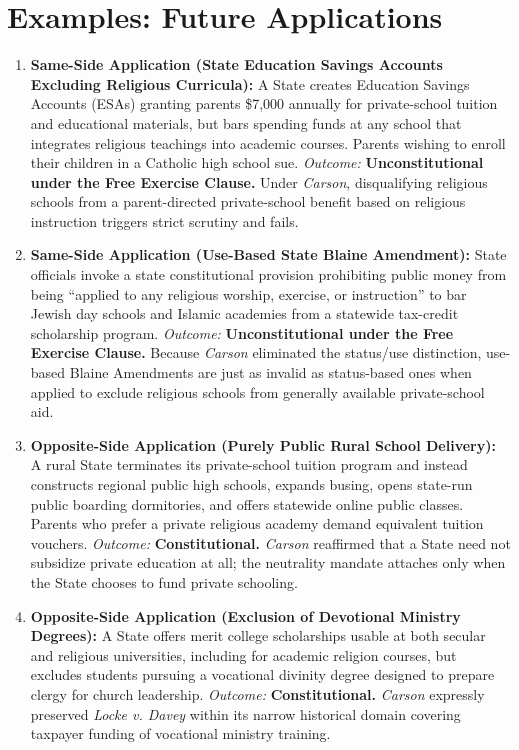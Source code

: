 \documentclass[12pt]{article}
\begin{document}
\section{Examples: Future Applications}

\begin{enumerate}
  \item \textbf{Same-Side Application (State Education Savings Accounts Excluding Religious Curricula):} A State creates Education Savings Accounts (ESAs) granting parents \$7,000 annually for private-school tuition and educational materials, but bars spending funds at any school that integrates religious teachings into academic courses. Parents wishing to enroll their children in a Catholic high school sue. \textit{Outcome:} \textbf{Unconstitutional under the Free Exercise Clause.} Under \textit{Carson}, disqualifying religious schools from a parent-directed private-school benefit based on religious instruction triggers strict scrutiny and fails.
  \item \textbf{Same-Side Application (Use-Based State Blaine Amendment):} State officials invoke a state constitutional provision prohibiting public money from being ``applied to any religious worship, exercise, or instruction'' to bar Jewish day schools and Islamic academies from a statewide tax-credit scholarship program. \textit{Outcome:} \textbf{Unconstitutional under the Free Exercise Clause.} Because \textit{Carson} eliminated the status/use distinction, use-based Blaine Amendments are just as invalid as status-based ones when applied to exclude religious schools from generally available private-school aid.
  \item \textbf{Opposite-Side Application (Purely Public Rural School Delivery):} A rural State terminates its private-school tuition program and instead constructs regional public high schools, expands busing, opens state-run public boarding dormitories, and offers statewide online public classes. Parents who prefer a private religious academy demand equivalent tuition vouchers. \textit{Outcome:} \textbf{Constitutional.} \textit{Carson} reaffirmed that a State need not subsidize private education at all; the neutrality mandate attaches only when the State chooses to fund private schooling.
  \item \textbf{Opposite-Side Application (Exclusion of Devotional Ministry Degrees):} A State offers merit college scholarships usable at both secular and religious universities, including for academic religion courses, but excludes students pursuing a vocational divinity degree designed to prepare clergy for church leadership. \textit{Outcome:} \textbf{Constitutional.} \textit{Carson} expressly preserved \textit{Locke v. Davey} within its narrow historical domain covering taxpayer funding of vocational ministry training.

\end{enumerate}
\end{document}
